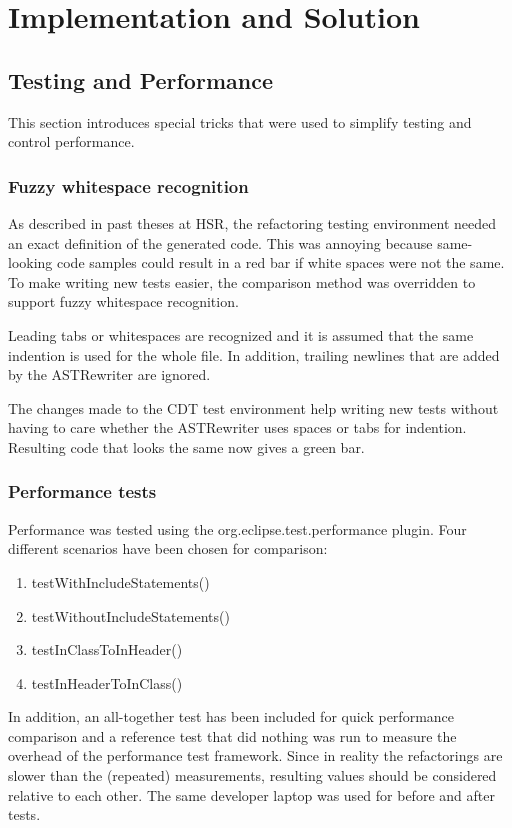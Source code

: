 \chapter{Implementation and Solution}
\thispagestyle{fancy}

\section{Testing and Performance}

This section introduces special tricks that were used to simplify testing and
control performance.

\subsection{Fuzzy whitespace recognition}

As described in past theses at HSR, the refactoring testing environment
needed an exact definition of the generated code. This was annoying because
same-looking code samples could result in a red bar if white spaces were not the
same. To make writing new tests easier, the comparison method was overridden to
support fuzzy whitespace recognition.

Leading tabs or whitespaces are recognized and it is assumed that the same
indention is used for the whole file. In addition, trailing newlines that are
added by the ASTRewriter are ignored.

The changes made to the CDT test environment help writing new tests without
having to care whether the ASTRewriter uses spaces or tabs for indention.
Resulting code that looks the same now gives a green bar.

\subsection{Performance tests}

Performance was tested using the org.eclipse.test.performance plugin. Four
different scenarios have been chosen for comparison:

\begin{enumerate}
\item testWithIncludeStatements()
\item testWithoutIncludeStatements()
\item testInClassToInHeader()
\item testInHeaderToInClass()
\end{enumerate}

In addition, an all-together test has been included for quick performance
comparison and a reference test that did nothing was run to measure the overhead
of the performance test framework. Since in reality the refactorings are slower
than the (repeated) measurements, resulting values should be considered relative
to each other. The same developer laptop was used for before and after tests.

